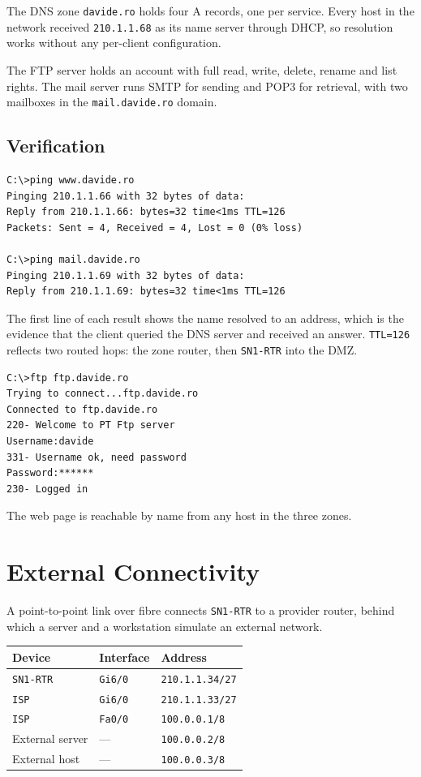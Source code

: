 \documentclass[12pt,a4paper]{article}
\begin{document}
The DNS zone \texttt{davide.ro} holds four A records, one per service. Every host
in the network received \texttt{210.1.1.68} as its name server through DHCP, so
resolution works without any per-client configuration.

The FTP server holds an account with full read, write, delete, rename and list
rights. The mail server runs SMTP for sending and POP3 for retrieval, with two
mailboxes in the \texttt{mail.davide.ro} domain.

\subsection{Verification}

\begin{lstlisting}
C:\>ping www.davide.ro
Pinging 210.1.1.66 with 32 bytes of data:
Reply from 210.1.1.66: bytes=32 time<1ms TTL=126
Packets: Sent = 4, Received = 4, Lost = 0 (0% loss)

C:\>ping mail.davide.ro
Pinging 210.1.1.69 with 32 bytes of data:
Reply from 210.1.1.69: bytes=32 time<1ms TTL=126
\end{lstlisting}

The first line of each result shows the name resolved to an address, which is the
evidence that the client queried the DNS server and received an answer.
\texttt{TTL=126} reflects two routed hops: the zone router, then
\texttt{SN1-RTR} into the DMZ.

\begin{lstlisting}
C:\>ftp ftp.davide.ro
Trying to connect...ftp.davide.ro
Connected to ftp.davide.ro
220- Welcome to PT Ftp server
Username:davide
331- Username ok, need password
Password:******
230- Logged in
\end{lstlisting}

The web page is reachable by name from any host in the three zones.

\section{External Connectivity}

A point-to-point link over fibre connects \texttt{SN1-RTR} to a provider router,
behind which a server and a workstation simulate an external network.

\begin{table}[H]
\centering
\begin{tabular}{@{} l l l @{}}
\toprule
\textbf{Device} & \textbf{Interface} & \textbf{Address} \\
\midrule
\texttt{SN1-RTR} & \texttt{Gi6/0} & \texttt{210.1.1.34/27} \\
\texttt{ISP}     & \texttt{Gi6/0} & \texttt{210.1.1.33/27} \\
\texttt{ISP}     & \texttt{Fa0/0} & \texttt{100.0.0.1/8} \\
External server  & ---            & \texttt{100.0.0.2/8} \\
External host    & ---            & \texttt{100.0.0.3/8} \\
\bottomrule
\end{tabular}
\end{table}
\end{document}
